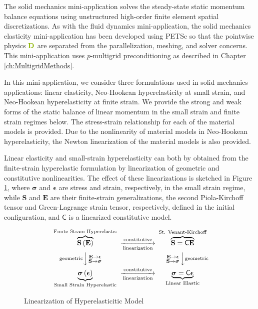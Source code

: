 The solid mechanics mini-application solves the steady-state static momentum balance equations using unstructured high-order finite element spatial discretizations.
As with the fluid dynamics mini-application, the solid mechanics elasticity mini-application has been developed using PETSc so that the pointwise physics ${\color{applegreen}\mathbf{D}}$ are separated from the parallelization, meshing, and solver concerns.
This mini-application uses $p$-multigrid preconditioning as described in Chapter \ref{ch:MultigridMethods}.

In this mini-application, we consider three formulations used in solid mechanics applications: linear elasticity, Neo-Hookean hyperelasticity at small strain, and Neo-Hookean hyperelasticity at finite strain.
We provide the strong and weak forms of the static balance of linear momentum in the small strain and finite strain regimes below.
The stress-strain relationship for each of the material models is provided.
Due to the nonlinearity of material models in Neo-Hookean hyperelasticity, the Newton linearization of the material models is also provided.

Linear elasticity and small-strain hyperelasticity can both by obtained from the finite-strain hyperelastic formulation by linearization of geometric and constitutive nonlinearities.
The effect of these linearizations is sketched in Figure \ref{fig:hyperelastic-cd}, where $\boldsymbol \sigma$ and $\boldsymbol \epsilon$ are stress and strain, respectively, in the small strain regime, while $\mathbf S$ and $\mathbf E$ are their finite-strain generalizations, the second Piola-Kirchoff tensor and Green-Lagrange strain tensor, respectively, defined in the initial configuration, and $\mathsf C$ is a linearized constitutive model.

\begin{figure}
$$
      \begin{CD}
        {\overbrace{\mathbf S \left( \mathbf E \right)}^{\text{Finite Strain Hyperelastic}}}
        @>{\text{constitutive}}>{\text{linearization}}>
        {\overbrace{\mathbf S = \mathsf C \mathbf E}^{\text{St. Venant-Kirchoff}}} \\
        @V{\text{geometric}}V{\begin{smallmatrix}\mathbf E \to \boldsymbol \epsilon \\ \mathbf S \to \boldsymbol \sigma \end{smallmatrix}}V
        @V{\begin{smallmatrix}\mathbf E \to \boldsymbol \epsilon \\ \mathbf S \to \boldsymbol \sigma \end{smallmatrix}}V{\text{geometric}}V \\
        {\underbrace{\boldsymbol \sigma \left( \boldsymbol \epsilon \right)}_\text{Small Strain Hyperelastic}}
        @>{\text{constitutive}}>\text{linearization}>
        {\underbrace{\boldsymbol \sigma = \mathsf C \boldsymbol \epsilon}_\text{Linear Elastic}}
      \end{CD}
$$
\caption{Linearization of Hyperelasticitic Model}
\label{fig:hyperelastic-cd}
\end{figure}

